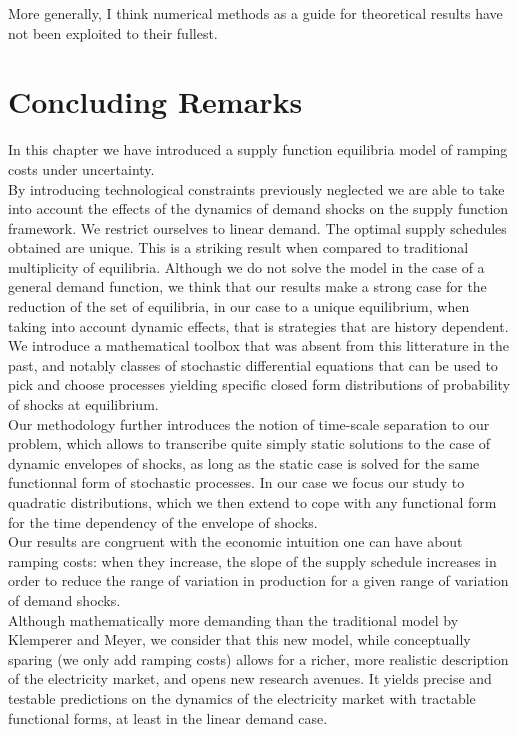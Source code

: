 More generally, I think numerical methods as a guide for theoretical results have not been exploited to their fullest.  

\section{Concluding Remarks}\label{ccl}

In this chapter we have introduced a supply function equilibria model of ramping costs under uncertainty.\\

By introducing technological constraints previously neglected we are able to take into account the effects of the dynamics of demand shocks on the supply function framework. We restrict ourselves to linear demand. The optimal supply schedules obtained are unique. This is a striking result when compared to traditional multiplicity of equilibria. Although we do not solve the model in the case of a general demand function, we think that our results make a strong case for the reduction of the set of equilibria, in our case to a unique equilibrium, when taking into account dynamic effects, that is strategies that are history dependent. \\

We introduce a mathematical toolbox that was absent from this litterature in the past, and notably classes of stochastic differential equations that can be used to pick and choose processes yielding specific closed form distributions of probability of shocks at equilibrium. \\

Our methodology further introduces the notion of time-scale separation to our problem, which allows to transcribe quite simply static solutions to the case of dynamic envelopes of shocks, as long as the static case is solved for the same functionnal form of stochastic processes. In our case we focus our study to quadratic distributions, which we then extend to cope with any functional form for the time dependency of the envelope of shocks.\\

Our results are congruent with the economic intuition one can have about ramping costs: when they increase, the slope of the supply schedule increases in order to reduce the range of variation in production for a given range of variation of demand shocks.\\

Although mathematically more demanding than the traditional model by Klemperer and Meyer, we consider that this new model, while conceptually sparing (we only add ramping costs) allows for a richer, more realistic description of the electricity market, and opens new research avenues.  It yields precise and testable predictions on the dynamics of the electricity market with tractable functional forms, at least in the linear demand case. \\

